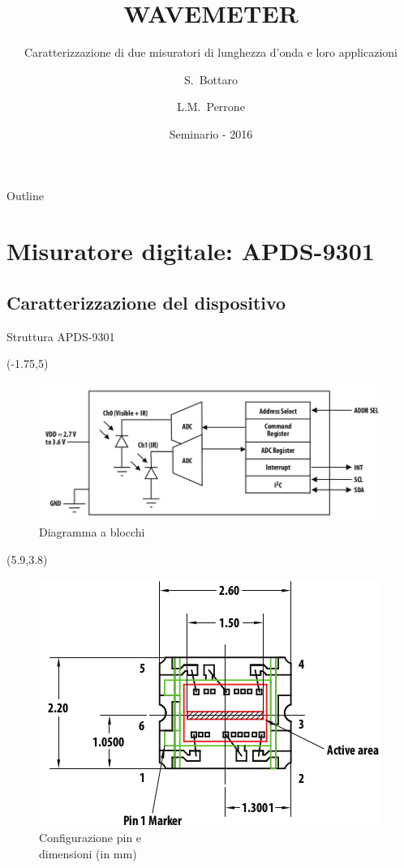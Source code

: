 \documentclass{beamer}
\title{WAVEMETER}
\subtitle{Caratterizzazione di due misuratori di lunghezza d'onda e loro applicazioni}
\author{S.~Bottaro\inst{1} \and L.M.~Perrone\inst{1}}
\institute[Unipi] %
{
  \inst{1}%
  Dipartimento di Fisica\\
  Università di Pisa
  }
\date{Seminario - 2016}
\begin{document}
\begin{frame}
  \titlepage
\end{frame}

\begin{frame}{Outline}
  \tableofcontents
\end{frame}

\section{Misuratore digitale: APDS-9301}
\subsection{Caratterizzazione del dispositivo}


\begin{frame}{Struttura APDS-9301}
\begin{textblock}{12}(-1.75,5)
\begin{figure}
\centering
\includegraphics[width=0.65\linewidth]{./blockdiag}
\caption{Diagramma a blocchi}
\end{figure}
\end{textblock}

\begin{textblock}{12}(5.9,3.8)
\begin{figure}
\centering
\includegraphics[width=0.55\linewidth]{./device}
\caption{Configurazione pin e \\ dimensioni (in mm)}
\label{fig:resp}
\end{figure}
\end{textblock}
\end{frame}
\end{document}
